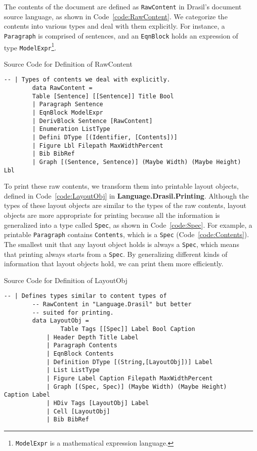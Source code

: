 The contents of the document are defined as \texttt{RawContent} in Drasil's 
document source language, as shown in Code~\ref{code:RawContent}. We categorize 
the contents into various types and deal with them explicitly. For instance, a 
\texttt{Paragraph} is comprised of sentences, and an \texttt{EqnBlock} holds an 
expression of type \texttt{ModelExpr}\footnote{\texttt{ModelExpr} is a 
mathematical expression language.}. 

\begin{listing}[h]
	\caption{Source Code for Definition of RawContent}
	\label{code:RawContent}
	\begin{lstlisting}[language=haskell1]
		-- | Types of contents we deal with explicitly.
		data RawContent =
		Table [Sentence] [[Sentence]] Title Bool
		| Paragraph Sentence                       
		| EqnBlock ModelExpr                      
		| DerivBlock Sentence [RawContent]        
		| Enumeration ListType                    
		| Defini DType [(Identifier, [Contents])] 
		| Figure Lbl Filepath MaxWidthPercent     
		| Bib BibRef                              
		| Graph [(Sentence, Sentence)] (Maybe Width) (Maybe Height) Lbl
	\end{lstlisting}
\end{listing}

To print these raw contents, we transform them into printable layout objects, 
defined in Code~\ref{code:LayoutObj} in \textbf{Language.Drasil.Printing}. 
Although the types of these layout objects are similar to the types of the raw 
contents, layout objects are more appropriate for printing because all the 
information is generalized into a type called \texttt{Spec}, as shown in 
Code~\ref{code:Spec}. For example, a printable \texttt{Paragraph} contains 
\texttt{Contents}, which is a \texttt{Spec} (Code~\ref{code:Contents}). The 
smallest unit that any layout object holds is always a \texttt{Spec}, which 
means that printing always starts from a \texttt{Spec}. By generalizing  
different kinds of information that layout objects hold, we can print them more 
efficiently. 

\begin{listing}[h]
	\caption{Source Code for Definition of LayoutObj}
	\label{code:LayoutObj}
	\begin{lstlisting}[language=haskell1]
		-- | Defines types similar to content types of 
		-- RawContent in "Language.Drasil" but better 
		-- suited for printing.
		data LayoutObj = 
				Table Tags [[Spec]] Label Bool Caption                          
			| Header Depth Title Label                                       
			| Paragraph Contents                                              
			| EqnBlock Contents                                               
			| Definition DType [(String,[LayoutObj])] Label                   
			| List ListType                                                   
			| Figure Label Caption Filepath MaxWidthPercent                  
			| Graph [(Spec, Spec)] (Maybe Width) (Maybe Height) Caption Label 
			| HDiv Tags [LayoutObj] Label                                    
			| Cell [LayoutObj] 
			| Bib BibRef         
	\end{lstlisting}
\end{listing}

